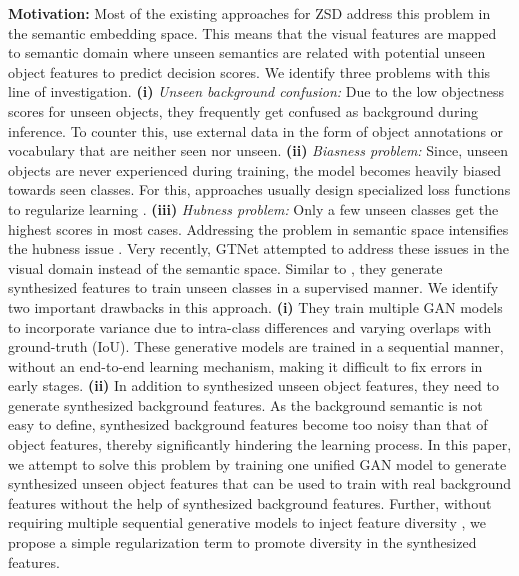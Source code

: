 \documentclass[runningheads]{llncs}
\begin{document}
\textbf{Motivation:} Most of the existing approaches for ZSD address this problem in the semantic embedding space. This means that the visual features are mapped to semantic domain where unseen semantics are related with potential unseen object features to predict decision scores.  We identify three problems with this line of investigation. \textbf{(i)} \emph{Unseen background confusion:} Due to the low objectness scores for unseen objects, they frequently get confused as background during inference. To counter this, \cite{bansal2018zero,rahman2018polarity} use external data in the form of object annotations or vocabulary that are neither seen nor unseen. \textbf{(ii)} \emph{Biasness problem:} Since, unseen objects are never experienced during training, the model becomes heavily biased towards seen classes. For this, approaches usually design specialized loss functions to regularize learning \cite{rahman2018polarity,rahman2018zero}. \textbf{(iii)} \emph{Hubness problem:} Only a few unseen classes get the highest scores in most cases. Addressing the problem in semantic space intensifies the hubness issue \cite{Zhang_2017_CVPR}. Very recently, GTNet \cite{zhao2020gtnet} attempted to address these issues in the visual domain instead of the semantic space. Similar to \cite{xian2018feature}, they generate synthesized features to train unseen classes in a supervised manner. We identify two important drawbacks in this approach. \textbf{(i)} They train multiple GAN models to incorporate variance due to intra-class differences and varying overlaps with ground-truth (IoU). These generative models are trained in a sequential manner, without an end-to-end learning mechanism, making it difficult to fix errors in early stages.  \textbf{(ii)} In addition to synthesized unseen object features, they need to generate synthesized background features. As the background semantic is not easy to define, synthesized background features become too noisy than that of object features, thereby significantly hindering the learning process. In this paper, we attempt to solve this problem by training one unified GAN model to generate synthesized unseen object features that can be used to train with real background features without the help of synthesized background features. Further, without requiring multiple sequential generative models to inject feature diversity \cite{zhao2020gtnet}, we propose a simple regularization term to promote diversity in the synthesized features. 
\end{document}
